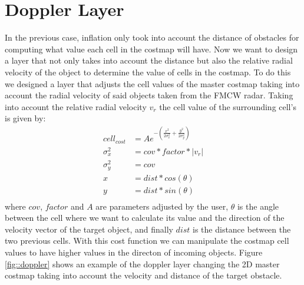 \section{Doppler Layer}
In the previous case, inflation only took into account the distance of obstacles for computing what value each cell in the costmap will have. Now we want to design a layer that not only takes into account the distance but also the relative radial velocity of the object to determine the value of cells in the costmap.
To do this we designed a layer that adjusts the cell values of the master costmap taking into account the radial velocity of said objects taken from the \ac{FMCW} \ac{radar}. Taking into account the relative  radial velocity $v_r$ the cell value of the surrounding cell's is given by:
\begin{equation} \label{eq1}
\begin{split}
cell_{cost} & = A e^{-(\frac{x^2}{2 \sigma_x^2}+\frac{y^2}{2 \sigma_y^2})} \\
 \sigma_x^2 & = cov * factor * |v_r| \\
 \sigma_y^2 & = cov \\
 x & =dist *cos(\theta)\\
 y & =dist *sin(\theta)\\
\end{split}
\end{equation}
where $cov$, $factor$ and $A$ are parameters adjusted by the user, $\theta$ is the angle between the cell where we want to calculate its value and the direction of the velocity vector of the target object, and finally $dist$ is the distance between the two previous cells.
With this cost function we can manipulate the costmap cell values to have higher values in the directon of incoming objects. Figure \ref{fig::doppler} shows an example of the doppler layer changing the 2D master costmap taking into account the velocity and distance of the target obstacle. 

